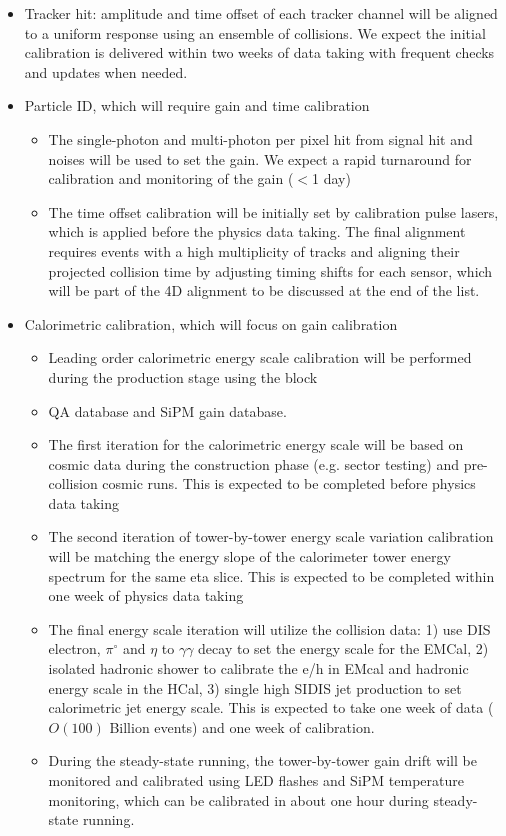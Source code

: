\begin{itemize}
\item Tracker hit: amplitude and time offset of each tracker channel will be aligned to a uniform response using an ensemble of collisions. We expect the initial calibration is delivered within two weeks of data taking with frequent checks and updates when needed. 
\item Particle ID, which will require gain and time calibration
\begin{itemize}
  \item The single-photon and multi-photon per pixel hit from signal hit and noises will be used to set the gain. We expect a rapid turnaround for calibration and monitoring of the gain ($<$1 day)
  \item The time offset calibration will be initially set by calibration pulse lasers, which is applied before the physics data taking. The final alignment requires events with a high multiplicity of tracks and aligning their projected collision time by adjusting timing shifts for each sensor, which will be part of the 4D alignment to be discussed at the end of the list. 
\end{itemize}
\item Calorimetric calibration, which will focus on gain calibration
\begin{itemize}
  \item Leading order calorimetric energy scale calibration will be performed during the production stage using the block 
  \item QA database and SiPM gain database. 
  \item The first iteration for the calorimetric energy scale will be based on cosmic data during the construction phase (e.g. sector testing) and pre-collision cosmic runs. This is expected to be completed before physics data taking
  \item The second iteration of tower-by-tower energy scale variation calibration will be matching the energy slope of the calorimeter tower energy spectrum for the same eta slice.   This is expected to be completed within one week of physics data taking
  \item The final energy scale iteration will utilize the collision data: 1) use DIS electron, $\pi^{\circ}$ and $\eta$ to $\gamma \gamma$ decay to set the energy scale for the EMCal, 2) isolated hadronic shower to calibrate the e/h in EMcal and hadronic energy scale in the HCal, 3) single high SIDIS jet production to set calorimetric jet energy scale. This is expected to take one week of data ($O(100)$ Billion events) and one week of calibration. 
  \item During the steady-state running, the tower-by-tower gain drift will be monitored and calibrated using LED flashes and SiPM temperature monitoring, which can be calibrated in about one hour during steady-state running. 
\end{itemize}


\end{itemize}

